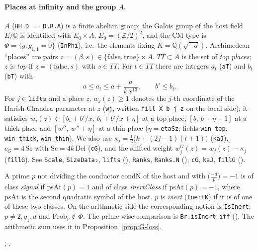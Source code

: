 \paragraph{Places at infinity and the group $A$.} $A$ (\texttt{HH D} $=$ \texttt{D.R.A}) is a finite abelian
group; the Galois group of the host field $E/\mathbb Q$ is identified with $E_0\times A$,
$E_0=(\mathbb Z/2)^2$, and the CM type is $\Phi=\{g: g_{1,1}=0\}$ (\texttt{InPhi}), i.e.\ the elements fixing
$K=\mathbb Q(\sqrt{-d})$. Archimedean ``places'' are pairs $z=(\beta,s)\in\{\mathrm{false},\mathrm{true}\}\times A$.
$TT\subset A$ is the set of \emph{top places}; $z$ is \emph{top} if $z=(\mathrm{false},s)$ with $s\in TT$.
For $t\in TT$ there are integers $a_t$ (\texttt{aT}) and $b_t$ (\texttt{bT}) with
\begin{equation}\label{eq:G-windows}
  a\le a_t\le a+\frac{a}{k\,x^{13}},\qquad b'\le b_t .
\end{equation}
For $j\in\texttt{lifts}$ and a place $z$, $w_j(z)\ge 1$ denotes the $j$-th coordinate of the Harish-Chandra
parameter at $z$ (\texttt{wj}, written \texttt{fill X b j z} on the local side); it satisfies
$w_j(z)\in[b_t+b'/x,\ b_t+b'/x+\eta]$ at a top place, $[b,\ b+\eta+1]$ at a thick place and
$[w'',\ w''+\eta]$ at a thin place ($\eta=$\texttt{etaSz}; fields \texttt{win\_top}, \texttt{win\_thick},
\texttt{win\_thin}). We also use $\kappa_j=\tfrac12\bigl(k+(2j-1)(t+1)\bigr)$ (\texttt{kaJ}),
$c_G=4\,\mathrm{Sc}$ with $\mathrm{Sc}=4k\,\mathrm{Del}$ (\texttt{cG}), and the shifted weight
$w^{G}_j(z)=w_j(z)-\kappa_j$ (\texttt{fillG}). See \texttt{Scale}, \texttt{SizeData₂},
\texttt{lifts} (),
\texttt{Ranks}, \texttt{Ranks.N} (),
\texttt{cG}, \texttt{kaJ}, \texttt{fillG} ().

\begin{definition}\label{def:G-inert}
A prime $p$ not dividing the conductor $\mathrm{condN}$ of the host and with $\bigl(\tfrac{-d}{p}\bigr)=-1$ is
of class \emph{signal} if $\mathrm{psAt}(p)=1$ and of class \emph{inertClass} if $\mathrm{psAt}(p)=-1$, where
$\mathrm{psAt}$ is the second quadratic symbol of the host. $p$ is \emph{inert} (\texttt{InertK}) if it is of
one of these two classes. On the arithmetic side the corresponding notion is \texttt{IsInert}: $p\ne 2,q_1,d$ and
$\mathrm{Frob}_p\notin\Phi$. The prime-wise comparison is \texttt{Br.isInert\_iff}
().
The arithmetic sum uses it in Proposition~\ref{prop:G-loss}.
\par{\small {}; .}\par
\end{definition}

